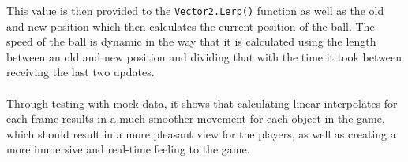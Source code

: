 This value is then provided to the \texttt{Vector2.Lerp()} function as well as the old and new position which then calculates the current position of the ball.
The speed of the ball is dynamic in the way that it is calculated using the length between an old and new position and dividing that with the time it took between receiving the last two updates.
\\\\
Through testing with mock data, it shows that calculating linear interpolates for each frame results in a much smoother movement for each object in the game, which should result in a more pleasant view for the players, as well as creating a more immersive and real-time feeling to the game.
